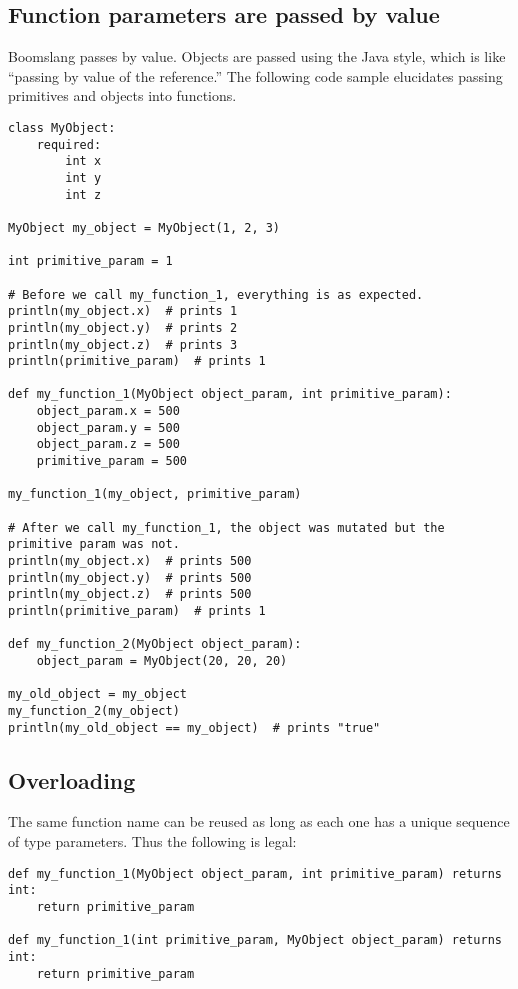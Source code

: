 \documentclass{article}
\begin{document}
\subsection{Function parameters are passed by value}
Boomslang passes by value. Objects are passed using the Java style, which is like ``passing by value of the reference.'' The following code sample elucidates passing primitives and objects into functions. 

\begin{verbatim}
class MyObject:
    required:
        int x
        int y
        int z

MyObject my_object = MyObject(1, 2, 3)

int primitive_param = 1

# Before we call my_function_1, everything is as expected.
println(my_object.x)  # prints 1
println(my_object.y)  # prints 2
println(my_object.z)  # prints 3
println(primitive_param)  # prints 1

def my_function_1(MyObject object_param, int primitive_param):
    object_param.x = 500
    object_param.y = 500
    object_param.z = 500
    primitive_param = 500
    
my_function_1(my_object, primitive_param)

# After we call my_function_1, the object was mutated but the primitive param was not.
println(my_object.x)  # prints 500
println(my_object.y)  # prints 500
println(my_object.z)  # prints 500
println(primitive_param)  # prints 1

def my_function_2(MyObject object_param):
    object_param = MyObject(20, 20, 20)
    
my_old_object = my_object
my_function_2(my_object)
println(my_old_object == my_object)  # prints "true"
\end{verbatim}

\subsection{Overloading}
The same function name can be reused as long as each one has a unique sequence of type parameters. Thus the following is legal:

\begin{verbatim}
def my_function_1(MyObject object_param, int primitive_param) returns int:
    return primitive_param
    
def my_function_1(int primitive_param, MyObject object_param) returns int:
    return primitive_param
\end{verbatim}
\end{document}
